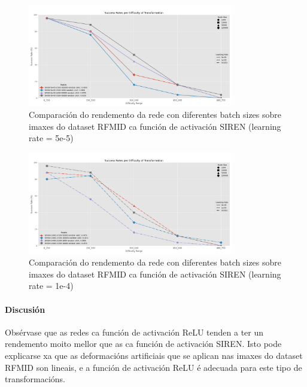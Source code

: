 \begin{figure}[ht] 
    \centering
    \includegraphics[width=0.8\textwidth]{imaxes/batchsize/experiment_plot_RFMID_SIREN_5e-05.png}
    \caption{Comparación do rendemento da rede con diferentes batch sizes sobre imaxes do dataset RFMID ca función de activación SIREN (learning rate = 5e-5)}
    \label{fig:batch_size_comparison_siren_5e-5}
\end{figure}

\begin{figure}[ht] 
    \centering
    \includegraphics[width=0.8\textwidth]{imaxes/batchsize/experiment_plot_RFMID_SIREN_0.0001.png}
    \caption{Comparación do rendemento da rede con diferentes batch sizes sobre imaxes do dataset RFMID ca función de activación SIREN (learning rate = 1e-4)}
    \label{fig:batch_size_comparison_siren_1e-4}
\end{figure}


\paragraph{Discusión}
\label{par:Discusion-batchsize}

Obsérvase que as redes ca función de activación ReLU tenden a ter un rendemento moito mellor que as ca función de activación SIREN. Isto pode explicarse xa que as deformacións artificiais que se aplican nas imaxes do dataset RFMID son lineais, e a función de activación ReLU é adecuada para este tipo de transformacións.

